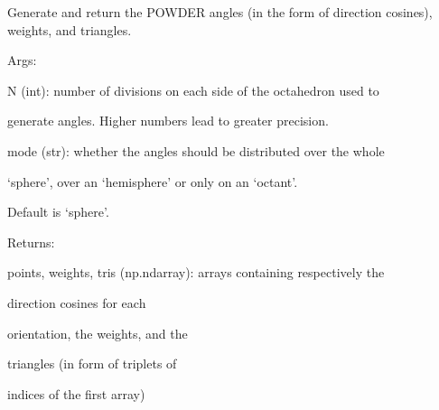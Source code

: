 \documentclass[letterpaper,10pt,english]{sphinxmanual}
\begin{document}
\begin{fulllineitems}
\label{doctree/soprano.calculate.nmr.powder:soprano.calculate.nmr.powder.gen_pwd_ang}
Generate and return the POWDER angles (in the form of direction cosines),
weights, and triangles.

\begin{DUlineblock}{0em}
\item[] Args:
\item[]
\begin{DUlineblock}{\DUlineblockindent}
\item[] N (int): number of divisions on each side of the octahedron used to
\item[]
\begin{DUlineblock}{\DUlineblockindent}
\item[] generate angles. Higher numbers lead to greater precision.
\end{DUlineblock}
\item[] mode (str): whether the angles should be distributed over the whole
\item[]
\begin{DUlineblock}{\DUlineblockindent}
\item[] `sphere', over an `hemisphere' or only on an `octant'.
\item[] Default is `sphere'.
\end{DUlineblock}
\end{DUlineblock}
\end{DUlineblock}

\begin{DUlineblock}{0em}
\item[] Returns:
\item[]
\begin{DUlineblock}{\DUlineblockindent}
\item[] points, weights, tris (np.ndarray): arrays containing respectively the
\item[]
\begin{DUlineblock}{\DUlineblockindent}
\item[] direction cosines for each
\item[] orientation, the weights, and the
\item[] triangles (in form of triplets of
\item[] indices of the first array)
\end{DUlineblock}
\end{DUlineblock}
\end{DUlineblock}

\end{fulllineitems}
\end{document}
